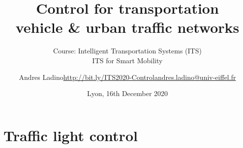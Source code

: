 \documentclass[10pt]{beamer}
\title[Control of Traffic Networks]{Control for transportation\\ vehicle \& urban traffic networks}
\subtitle{Course: Intelligent Transportation Systems (ITS)\\ ITS for Smart Mobility}
\date{Lyon, 16th December 2020}
\author{\texorpdfstring{Andres Ladino\newline\url{http://bit.ly/ITS2020-Control}\newline\url{andres.ladino@univ-eiffel.fr}}{}}
\institute{Universit\'e Gustave Eiffel (UGE)} \titlegraphic{\hfill\texttt{[image: logo.png]}}
\begin{document}
\maketitle













\section{Traffic light control}















\end{document}
